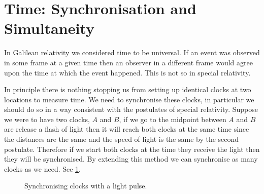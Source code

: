 \documentclass[fleqn]{NotesClass}
\begin{document}
    \section{Time: Synchronisation and Simultaneity}
    In Galilean relativity we considered time to be universal.
    If an event was observed in some frame at a given time then an observer in a different frame would agree upon the time at which the event happened.
    This is not so in special relativity.
    
    In principle there is nothing stopping us from setting up identical clocks at two locations to measure time.
    We need to synchronise these clocks, in particular we should do so in a way consistent with the postulates of special relativity.
    Suppose we were to have two clocks, \(A\) and \(B\), if we go to the midpoint between \(A\) and \(B\) are release a flash of light then it will reach both clocks at the same time since the distances are the same and the speed of light is the same by the second postulate.
    Therefore if we start both clocks at the time they receive the light then they will be synchronised.
    By extending this method we can synchronise as many clocks as we need.
    See \cref{fig:synchronise clocks}.
    
    \begin{figure}
        \caption{Synchronising clocks with a light pulse.}
        \label{fig:synchronise clocks}
    \end{figure}
\end{document}
